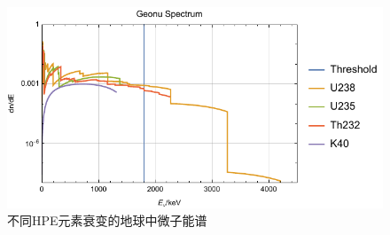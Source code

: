 				\begin{figure}[H]
					\centering
					\includegraphics[scale = 1.2]{./Pics/Geonu_Decay_Spectrum.pdf}
					\caption{不同HPE元素衰变的地球中微子能谱\cite{Enomoto_Spectrum}}
					\label{Fig:Geonu Decay}
				\end{figure}

